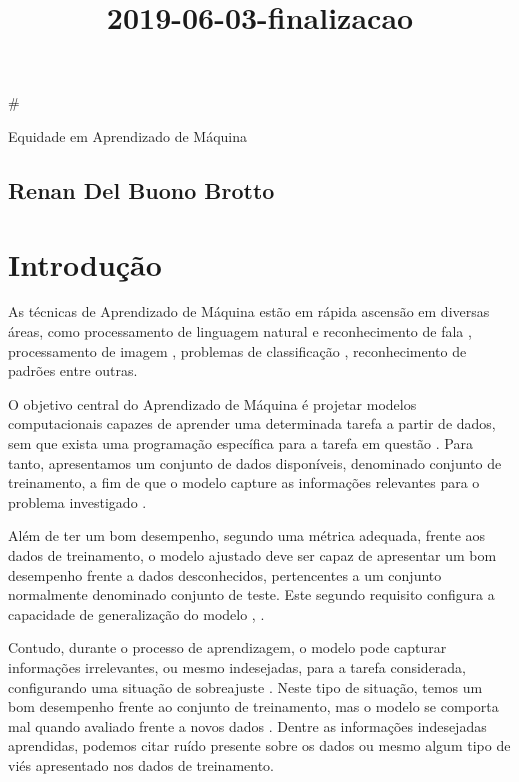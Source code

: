 \documentclass[11pt]{article}
\title{2019-06-03-finalizacao}
\begin{document}
    
    
    \maketitle
    
    

    
    \#

Equidade em Aprendizado de Máquina

\subsection{Renan Del Buono Brotto}\label{renan-del-buono-brotto}

\section{Introdução}\label{introduuxe7uxe3o}

As técnicas de Aprendizado de Máquina estão em rápida ascensão em
diversas áreas, como processamento de linguagem natural e reconhecimento
de fala \cite{Kamath2019}, processamento de imagem \cite{Cipolla2013},
problemas de classificação \cite{Duda2000}, reconhecimento de padrões
\cite{Bishop2006} entre outras.

O objetivo central do Aprendizado de Máquina é projetar modelos
computacionais capazes de aprender uma determinada tarefa a partir de
dados, sem que exista uma programação específica para a tarefa em
questão \cite{Samuel1959}. Para tanto, apresentamos um conjunto de dados
disponíveis, denominado conjunto de treinamento, a fim de que o modelo
capture as informações relevantes para o problema investigado
\cite{Hastie2009}.

Além de ter um bom desempenho, segundo uma métrica adequada, frente aos
dados de treinamento, o modelo ajustado deve ser capaz de apresentar um
bom desempenho frente a dados desconhecidos, pertencentes a um conjunto
normalmente denominado conjunto de teste. Este segundo requisito
configura a capacidade de generalização do modelo \cite{Bishop2006},
\cite{haykin-rn}.

Contudo, durante o processo de aprendizagem, o modelo pode capturar
informações irrelevantes, ou mesmo indesejadas, para a tarefa
considerada, configurando uma situação de sobreajuste \cite{haykin-rn}.
Neste tipo de situação, temos um bom desempenho frente ao conjunto de
treinamento, mas o modelo se comporta mal quando avaliado frente a novos
dados \cite{Bishop2006}. Dentre as informações indesejadas aprendidas,
podemos citar ruído presente sobre os dados \cite{Bishop2006} ou mesmo
algum tipo de viés apresentado nos dados de treinamento.
\end{document}
